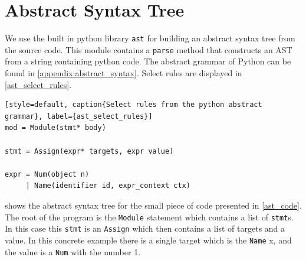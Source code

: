 \section{Abstract Syntax Tree}
We use the built in python library \texttt{ast} for building an abstract syntax tree from the source code.
This module contains a \texttt{parse} method that constructs an AST from a string containing python code.
The abstract grammar of Python can be found in \cref{appendix:abstract_syntax}.
Select rules are displayed in \cref{ast_select_rules}.

\begin{lstlisting}[style=default, caption{Select rules from the python abstract grammar}, label={ast_select_rules}]
mod = Module(stmt* body)

stmt = Assign(expr* targets, expr value)

expr = Num(object n)
     | Name(identifier id, expr_context ctx)
\end{lstlisting}

 shows the abstract syntax tree for the small piece of code presented in \cref{ast_code}.
The root of the program is the \texttt{Module} statement which contains a list of \texttt{stmt}s.
In this case this \texttt{stmt} is an \texttt{Assign} which then contains a list of targets and a value.
In this concrete example there is a single target which is the \texttt{Name} x, and the value is a \texttt{Num} with the number 1.

